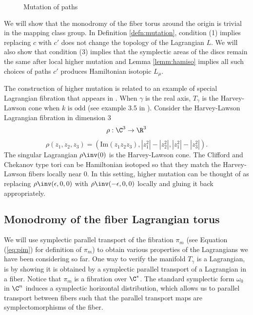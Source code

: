 \begin{figure}[ht]
    \centering
    \caption{Mutation of paths}
    \label{fig:gamm}
\end{figure}


We will show that the monodromy of the fiber torus around the origin is trivial in the mapping class group.  In Definition \ref{defn:mutation}, condition (1) implies replacing $c$ with $c'$ does not change the topology of the Lagrangian $L$.  We will also show that condition (3) implies that the symplectic areas of the discs remain the same after local higher mutation and Lemma \ref{lemm:hamiso} implies all such choices of paths $c'$ produces Hamiltonian isotopic $L_\mu$. 
 
 
 
 

The construction of higher mutation is related to an example of special Lagrangian fibration that appears in \cite{joy}.  When $\gamma$ is the real axis,  $T_\gamma$ is the Harvey-Lawson cone when $k\text{ is odd}$ (see example 3.5 in \cite{joy}).   Consider the Harvey-Lawson Lagrangian fibration in dimension 3 $$\rho : \C^3 \to \R^3 $$    $$\rho(z_1, z_2, z_3) = (\text{Im} (z_1z_2z_3), |z_1^2|-|z_2^2|, |z_1^2|-|z_3^2|). $$
The singular Lagrangian $\rho \inv (0)$ is the Harvey-Lawson cone.  The Clifford and Chekanov type tori can be Hamiltonian isotoped so that they match the Harvey-Lawson fibers locally near 0.  In this setting,  higher mutation can be thought of as replacing $\rho\inv (\epsilon, 0, 0)$ with $\rho\inv(-\epsilon, 0, 0)$ locally and gluing it back appropriately. 


\subsection{Monodromy of the fiber Lagrangian torus}

We will use symplectic parallel transport of the fibration $\pi_m$ (see Equation (\ref{eq:pim}) for definition of $\pi_m$) to obtain various properties of the Lagrangians we have been considering so far. One way to verify the manifold $T_\gamma$ is a Lagrangian, is by showing it is obtained by a symplectic parallel transport of a Lagrangian in a fiber. Notice that $\pi_m$ is a fibration over $\C^*$. The standard symplectic form $\omega_0$ in $\C^n$ induces a symplectic horizontal distribution, which allows us to parallel transport between fibers such that the parallel transport maps are symplectomorphisms of the fiber.

